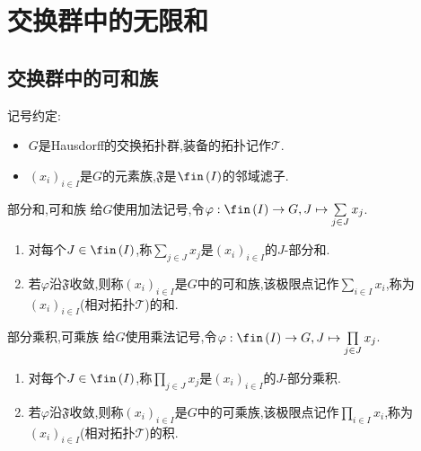 \chapter{交换群中的无限和}

\section{交换群中的可和族}

记号约定:
\begin{itemize}
	\item $G$是Hausdorff的交换拓扑群,装备的拓扑记作$\mathscr{T}$.
	\item $\left(x_{i}\right)_{i\in I}$是$G$的元素族,$\mathfrak{F}$是$\fin\left(I\right)$的邻域滤子.
\end{itemize}

\begin{definition}{部分和,可和族}{}
	给$G$使用加法记号,令$\varphi:\fin\left(I\right)\to G,J\mapsto\sum\limits_{j\in J}x_{j}$.
	\begin{enumerate}
		\item 对每个$J\in\fin\left(I\right)$,称$\sum\limits_{j\in J}x_{j}$是$\left(x_{i}\right)_{i\in I}$的$J$-部分和.
		\item 若$\varphi$沿$\mathfrak{F}$收敛,则称$\left(x_{i}\right)_{i\in I}$是$G$中的可和族,该极限点记作$\sum\limits_{i\in I}x_{i}$,称为$\left(x_{i}\right)_{i\in I}$(相对拓扑$\mathscr{T}$)的和.
	\end{enumerate}
\end{definition}

\begin{definition}{部分乘积,可乘族}{}
	给$G$使用乘法记号,令$\varphi:\fin\left(I\right)\to G,J\mapsto\prod\limits_{j\in J}x_{j}$.
	\begin{enumerate}
		\item 对每个$J\in\fin\left(I\right)$,称$\prod\limits_{j\in J}x_{j}$是$\left(x_{i}\right)_{i\in I}$的$J$-部分乘积.
		\item 若$\varphi$沿$\mathfrak{F}$收敛,则称$\left(x_{i}\right)_{i\in I}$是$G$中的可乘族,该极限点记作$\prod\limits_{i\in I}x_{i}$,称为$\left(x_{i}\right)_{i\in I}$(相对拓扑$\mathscr{T}$)的积.
	\end{enumerate}
\end{definition}

